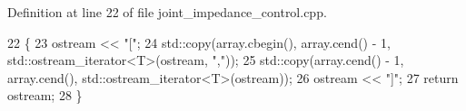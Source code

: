 Definition at line 22 of file joint\+\_\+impedance\+\_\+control.\+cpp.


\begin{DoxyCode}
22                                                                          \{
23   ostream << \textcolor{stringliteral}{"["};
24   std::copy(array.cbegin(), array.cend() - 1, std::ostream\_iterator<T>(ostream, \textcolor{stringliteral}{","}));
25   std::copy(array.cend() - 1, array.cend(), std::ostream\_iterator<T>(ostream));
26   ostream << \textcolor{stringliteral}{"]"};
27   \textcolor{keywordflow}{return} ostream;
28 \}
\end{DoxyCode}
